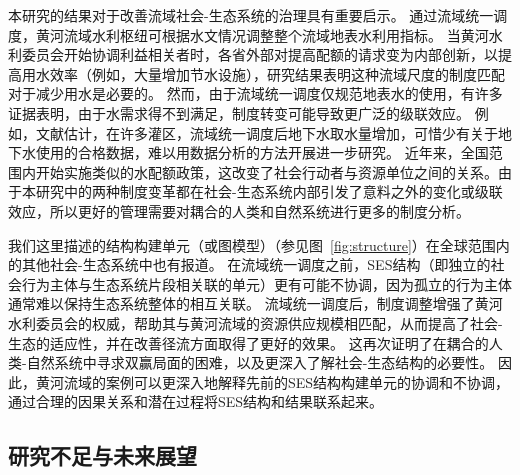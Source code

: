 本研究的结果对于改善流域社会-生态系统的治理具有重要启示。
通过流域统一调度，黄河流域水利枢纽可根据水文情况调整整个流域地表水利用指标。
当黄河水利委员会开始协调利益相关者时，各省外部对提高配额的请求变为内部创新，以提高用水效率（例如，大量增加节水设施）\cite{krieger1955, ostrom1990}，研究结果表明这种流域尺度的制度匹配对于减少用水是必要的。
然而，由于流域统一调度仅规范地表水的使用，有许多证据表明，由于水需求得不到满足，制度转变可能导致更广泛的级联效应。
例如，文献估计，在许多灌区，流域统一调度后地下水取水量增加，可惜少有关于地下水使用的合格数据，难以用数据分析的方法开展进一步研究\cite{sun2022b}。
近年来，全国范围内开始实施类似的水配额政策，这改变了社会行动者与资源单位之间的关系。由于本研究中的两种制度变革都在社会-生态系统内部引发了意料之外的变化或级联效应，所以更好的管理需要对耦合的人类和自然系统进行更多的制度分析。

我们这里描述的结构构建单元（或图模型）（参见图~\ref{fig:structure}）在全球范围内的其他社会-生态系统中也有报道。
在流域统一调度之前，SES结构（即独立的社会行为主体与生态系统片段相关联的单元）更有可能不协调，因为孤立的行为主体通常难以保持生态系统整体的相互关联\cite{sayles2017,sayles2019,cai2016,bergsten2019}。
流域统一调度后，制度调整增强了黄河水利委员会的权威，帮助其与黄河流域的资源供应规模相匹配，从而提高了社会-生态的适应性，并在改善径流方面取得了更好的效果\cite{cumming2020a,wang2019d}。
这再次证明了在耦合的人类-自然系统中寻求双赢局面的困难\cite{hegwood2022}，以及更深入了解社会-生态结构的必要性\cite{bergsten2019, sayles2019}。
因此，黄河流域的案例可以更深入地解释先前的SES结构构建单元的协调和不协调，通过合理的因果关系和潜在过程将SES结构和结果联系起来。

\subsection{研究不足与未来展望}

